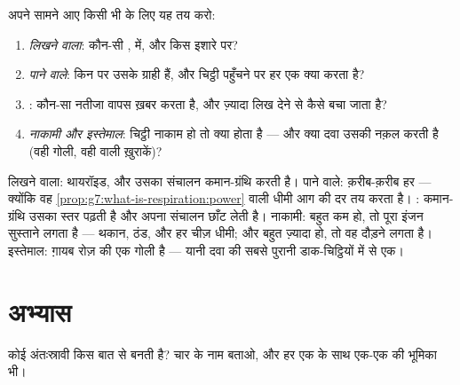 \begin{method}[किसी भी हॉर्मोन के चार सवाल]\label{met:g8:hormonal-communication:read}
अपने सामने आए किसी भी  के लिए यह तय करो:
\begin{enumerate}
  \item \emph{लिखने वाला}: कौन-सी ,  में, और किस इशारे
        पर?
  \item \emph{पाने वाले}: किन  पर उसके ग्राही हैं, और
        चिट्ठी पहुँचने पर हर एक क्या करता है?
  \item \emph{}: कौन-सा नतीजा वापस ख़बर करता है, और
        ज़्यादा लिख देने से कैसे बचा जाता है?
  \item \emph{नाकामी और इस्तेमाल}: चिट्ठी नाकाम हो तो क्या होता है
        --- और क्या दवा उसकी नक़ल करती है (वही गोली, वही  वाली
        ख़ुराकें)?
\end{enumerate}
\end{method}

\begin{example}[यह तरीक़ा थायरॉइड की चाल तय करने वाले पर]\label{ex:g8:hormonal-communication:thyroid}
लिखने वाला: थायरॉइड, और उसका संचालन कमान-ग्रंथि करती है। पाने वाले:
क़रीब-क़रीब हर  --- क्योंकि वह 
\cref{prop:g7:what-is-respiration:power} वाली धीमी आग की दर तय करता है।
: कमान-ग्रंथि उसका स्तर पढ़ती है और अपना संचालन छाँट लेती है।
नाकामी: बहुत कम हो, तो पूरा इंजन सुस्ताने लगता है --- थकान, ठंड, और हर
चीज़ धीमी; और बहुत ज़्यादा हो, तो वह दौड़ने लगता है। इस्तेमाल: ग़ायब
 रोज़ की एक गोली है --- यानी दवा की सबसे पुरानी डाक-चिट्ठियों में
से एक।
\end{example}

\section{अभ्यास}

\begin{exercise}[$\star$]\label{exo:g8:hormonal-communication:1}
कोई  अंतःस्रावी किस बात से बनती है? चार के नाम बताओ, और हर एक के
साथ एक-एक  की भूमिका भी।
\end{exercise}

